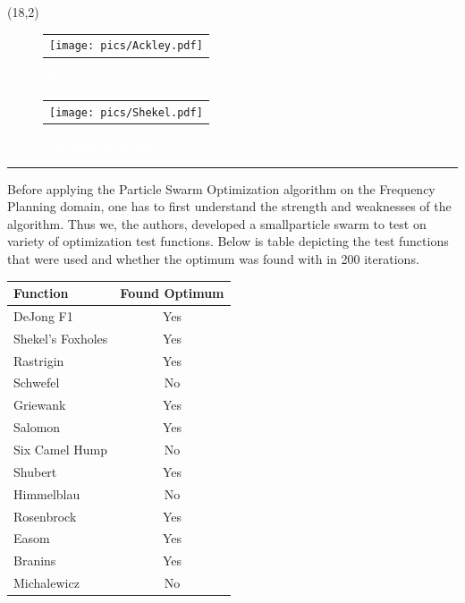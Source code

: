 \documentclass[portrait, a0]{a0poster}
\def\Heading#1{\noindent{\hfill{\LARGE{\color{BurntOrange} \bf #1}}}\medskip\hrule}
\begin{document}
\begin{textblock}{8}(18,2)
\begin{figure}
\centering
\begin{tabular}{c}
\\
\texttt{[image: pics/Ackley.pdf]}
\end{tabular}
\color{white}
\caption{\textcolor{white}{The Ackley Function \label{fig:DropWaveFunction}}}
\end{figure}

\begin{figure}
\centering
\begin{tabular}{c}
\\
\texttt{[image: pics/Shekel.pdf]}
\end{tabular}
\color{white}
\caption{\textcolor{white}{The Shekel Function\label{fig:logicalmappings}}}
\end{figure}

\Heading{Results}

Before applying the Particle Swarm Optimization algorithm on the Frequency Planning domain, one has to first understand the strength and weaknesses of the algorithm. Thus we, the authors, developed a smallparticle swarm to test on variety of optimization test functions. Below is table depicting the test functions that were used and whether the optimum was found with in 200 iterations.

\begin{center}
\begin{tabular}{| l | c |}
	\hline
	\textbf{Function} & \textbf{Found Optimum} \\
	\hline
	DeJong F1 & Yes \\
	\hline
	Shekel's Foxholes & Yes \\
	\hline
	Rastrigin & Yes \\
	\hline
	Schwefel & No \\
	\hline
	Griewank & Yes \\
	\hline
	Salomon & Yes \\
	\hline
	Six Camel Hump & No \\
	\hline
	Shubert & Yes \\
	\hline
	Himmelblau & No \\
	\hline
	Rosenbrock & Yes \\
	\hline
	Easom & Yes \\
	\hline
	Branins & Yes \\
	\hline
	Michalewicz & No \\
	\hline
\end{tabular}
\end{center}


\end{textblock}
\end{document}

